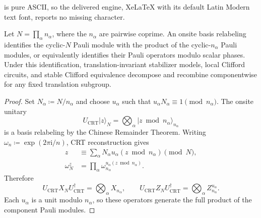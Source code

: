 \documentclass[10pt,a4paper]{amsart}
\begin{document}
is pure ASCII, so the delivered engine, XeLaTeX with its default Latin Modern text font, reports no missing character.
\begin{proposition}
	\label{prop:physical-crt-decomposition}
	Let $N=\prod_\alpha n_\alpha$, where the $n_\alpha$ are pairwise
	coprime. An onsite basis relabeling identifies the cyclic-$N$ Pauli module
	with the product of the cyclic-$n_\alpha$ Pauli modules, or equivalently
	identifies their Pauli operators modulo scalar phases. Under this
	identification, translation-invariant stabilizer models, local Clifford
	circuits, and stable Clifford equivalence decompose and recombine
	componentwise for any fixed translation subgroup.
\end{proposition}

\begin{proof}
	Set $N_\alpha\coloneqq N/n_\alpha$ and choose $u_\alpha$ such that
	$u_\alpha N_\alpha\equiv1\pmod{n_\alpha}$. The onsite unitary
	\begin{equation}
		U_{\mathrm{CRT}}\lvert z\rangle_N
		=
		\bigotimes_\alpha
		\lvert z\bmod n_\alpha\rangle_{n_\alpha}
		\label{eq:onsite-crt-unitary}
	\end{equation}
	is a basis relabeling by the Chinese Remainder Theorem. Writing
	$\omega_n\coloneqq\exp(2\pi\mathrm{i}/n)$, CRT reconstruction gives
	\begin{equation}
		\begin{aligned}
			z
			&\equiv
			\sum_\alpha N_\alpha u_\alpha(z\bmod n_\alpha)
			\pmod N,\\
			\omega_N^z
			&=
			\prod_\alpha
			\omega_{n_\alpha}^{u_\alpha(z\bmod n_\alpha)}.
		\end{aligned}
	\end{equation}
	Therefore
	\begin{equation}
		U_{\mathrm{CRT}}X_NU_{\mathrm{CRT}}^\dagger
		=
		\bigotimes_\alpha X_{n_\alpha},
		\qquad
		U_{\mathrm{CRT}}Z_NU_{\mathrm{CRT}}^\dagger
		=
		\bigotimes_\alpha Z_{n_\alpha}^{u_\alpha}.
		\label{eq:crt-pauli-factorization}
	\end{equation}
	Each $u_\alpha$ is a unit modulo $n_\alpha$, so these operators generate
	the full product of the component Pauli modules.


\end{proof}
\end{document}
